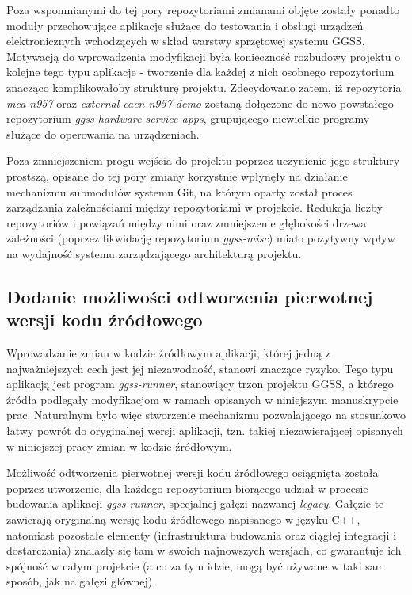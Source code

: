 Poza wspomnianymi do tej pory repozytoriami zmianami objęte zostały ponadto moduły przechowujące aplikacje służące do testowania i obsługi urządzeń elektronicznych wchodzących w skład warstwy sprzętowej systemu GGSS. Motywacją do wprowadzenia modyfikacji była konieczność rozbudowy projektu o kolejne tego typu aplikacje - tworzenie dla każdej z nich osobnego repozytorium znacząco komplikowałoby strukturę projektu. Zdecydowano zatem, iż repozytoria \emph{mca-n957} oraz \emph{external-caen-n957-demo} zostaną dołączone do nowo powstałego repozytorium \emph{ggss-hardware-service-apps}, grupującego niewielkie programy służące do operowania na urządzeniach.



Poza zmniejszeniem progu wejścia do projektu poprzez uczynienie jego struktury prostszą, opisane do tej pory zmiany korzystnie wpłynęły na działanie mechanizmu submodułów systemu Git, na którym oparty został proces zarządzania zależnościami między repozytoriami w projekcie. Redukcja liczby repozytoriów i powiązań między nimi oraz zmniejszenie głębokości drzewa zależności (poprzez likwidację repozytorium \emph{ggss-misc}) miało pozytywny wpływ na wydajność systemu zarządzającego architekturą projektu. 



\subsection{Dodanie możliwości odtworzenia pierwotnej wersji kodu źródłowego}
Wprowadzanie zmian w kodzie źródłowym aplikacji, której jedną z najważniejszych cech jest jej niezawodność, stanowi znaczące ryzyko. Tego typu aplikacją jest program \emph{ggss-runner}, stanowiący trzon projektu GGSS, a którego źródła podlegały modyfikacjom w ramach opisanych w niniejszym manuskrypcie prac. Naturalnym było więc stworzenie mechanizmu pozwalającego na stosunkowo łatwy powrót do oryginalnej wersji aplikacji, tzn. takiej niezawierającej opisanych w niniejszej pracy zmian w kodzie źródłowym.

Możliwość odtworzenia pierwotnej wersji kodu źródłowego osiągnięta została poprzez utworzenie, dla każdego repozytorium biorącego udział w procesie budowania aplikacji \emph{ggss-runner}, specjalnej gałęzi nazwanej \emph{legacy}. Gałęzie te zawierają oryginalną wersję kodu źródłowego napisanego w języku C++, natomiast pozostałe elementy (infrastruktura budowania oraz ciągłej integracji i dostarczania) znalazły się tam w swoich najnowszych wersjach, co gwarantuje ich spójność w całym projekcie (a co za tym idzie, mogą być używane w taki sam sposób, jak na gałęzi głównej).

